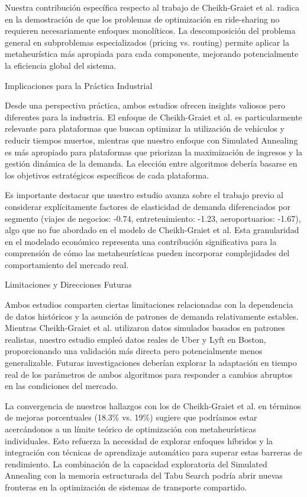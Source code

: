 \documentclass[conference]{IEEEtran}
\begin{document}
Nuestra contribución específica respecto al trabajo de Cheikh-Graiet et al. radica en la demostración de que los problemas de optimización en ride-sharing no requieren necesariamente enfoques monolíticos. La descomposición del problema general en subproblemas especializados (pricing vs. routing) permite aplicar la metaheurística más apropiada para cada componente, mejorando potencialmente la eficiencia global del sistema.

Implicaciones para la Práctica Industrial

Desde una perspectiva práctica, ambos estudios ofrecen insights valiosos pero diferentes para la industria. El enfoque de Cheikh-Graiet et al. es particularmente relevante para plataformas que buscan optimizar la utilización de vehículos y reducir tiempos muertos, mientras que nuestro enfoque con Simulated Annealing es más apropiado para plataformas que priorizan la maximización de ingresos y la gestión dinámica de la demanda. La elección entre algoritmos debería basarse en los objetivos estratégicos específicos de cada plataforma.

Es importante destacar que nuestro estudio avanza sobre el trabajo previo al considerar explícitamente factores de elasticidad de demanda diferenciados por segmento (viajes de negocios: -0.74, entretenimiento: -1.23, aeroportuarios: -1.67), algo que no fue abordado en el modelo de Cheikh-Graiet et al. Esta granularidad en el modelado económico representa una contribución significativa para la comprensión de cómo las metaheurísticas pueden incorporar complejidades del comportamiento del mercado real.

Limitaciones y Direcciones Futuras

Ambos estudios comparten ciertas limitaciones relacionadas con la dependencia de datos históricos y la asunción de patrones de demanda relativamente estables. Mientras Cheikh-Graiet et al. utilizaron datos simulados basados en patrones realistas, nuestro estudio empleó datos reales de Uber y Lyft en Boston, proporcionando una validación más directa pero potencialmente menos generalizable. Futuras investigaciones deberían explorar la adaptación en tiempo real de los parámetros de ambos algoritmos para responder a cambios abruptos en las condiciones del mercado.

La convergencia de nuestros hallazgos con los de Cheikh-Graiet et al. en términos de mejoras porcentuales (18.3\% vs. 19\%) sugiere que podríamos estar acercándonos a un límite teórico de optimización con metaheurísticas individuales. Esto refuerza la necesidad de explorar enfoques híbridos y la integración con técnicas de aprendizaje automático para superar estas barreras de rendimiento. La combinación de la capacidad exploratoria del Simulated Annealing con la memoria estructurada del Tabu Search podría abrir nuevas fronteras en la optimización de sistemas de transporte compartido.
\end{document}

